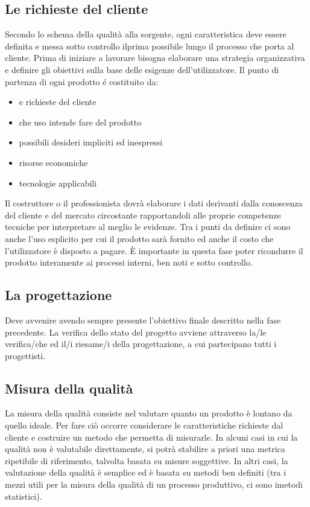 \documentclass[a4paper]{article}
\begin{document}
\subsection{Le richieste del cliente}
Secondo lo schema della qualità alla sorgente, ogni caratteristica deve essere definita 
e messa sotto controllo ilprima possibile lungo il processo che porta al cliente. 
Prima di iniziare a lavorare bisogna elaborare una strategia organizzativa e definire 
gli obiettivi sulla base delle esigenze dell'utilizzatore.\newline
Il punto di partenza di ogni prodotto é costituito da:
\begin{itemize}
    \item e richieste del cliente
    \item che uso intende fare del prodotto
    \item possibili desideri impliciti ed inespressi
    \item risorse economiche
    \item tecnologie applicabili 
\end{itemize}
Il costruttore o il professionista dovrà elaborare i dati derivanti dalla conoscenza 
del cliente e del mercato circostante rapportandoli alle proprie competenze
tecniche per interpretare al meglio le evidenze. \newline
Tra i punti da definire ci sono anche l'uso esplicito per cui il prodotto sarà 
fornito ed anche il costo che l'utilizzatore è disposto a pagare.\newline
È importante in questa fase poter ricondurre il prodotto interamente ai processi
interni, ben noti e sotto controllo.\newline
\subsection{La progettazione}
Deve avvenire avendo sempre presente l'obiettivo finale descritto nella fase precedente.\newline
La verifica dello stato del progetto avviene attraverso la/le verifica/che ed il/i riesame/i della progettazione, a cui
partecipano tutti i progettisti. \newline
\subsection{Misura della qualità}
La misura della qualità consiste nel valutare quanto un prodotto è lontano da quello 
ideale. Per fare ciò occorre considerare le caratteristiche richieste dal cliente e 
costruire un metodo che permetta di misurarle. \newline
In alcuni casi in cui la qualità non è valutabile direttamente, si potrà stabilire a 
priori una metrica ripetibile di riferimento, talvolta basata su misure soggettive. 
In altri casi, la valutazione della qualità è semplice ed è basata su metodi ben 
definiti (tra i mezzi utili per la misura della qualità di un processo produttivo, 
ci sono imetodi statistici).
\end{document}

